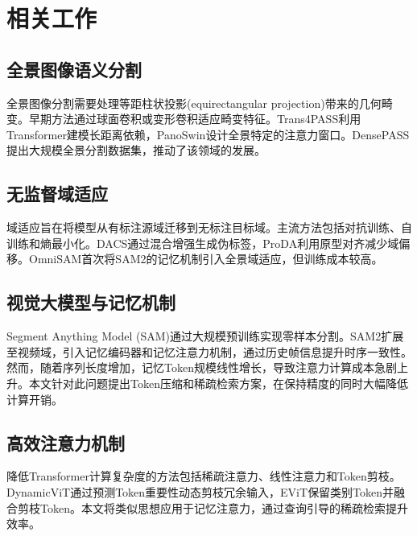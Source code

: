 \section{相关工作}

\subsection{全景图像语义分割}

全景图像分割需要处理等距柱状投影(equirectangular projection)带来的几何畸变。早期方法通过球面卷积\cite{su2017learning}或变形卷积\cite{dai2017deformable}适应畸变特征。Trans4PASS\cite{zhang2022trans4pass}利用Transformer建模长距离依赖，PanoSwin\cite{yang2023panoswin}设计全景特定的注意力窗口。DensePASS\cite{shen2023densepass}提出大规模全景分割数据集，推动了该领域的发展。

\subsection{无监督域适应}

域适应旨在将模型从有标注源域迁移到无标注目标域。主流方法包括对抗训练\cite{tsai2018learning}、自训练\cite{zou2018unsupervised}和熵最小化\cite{vu2019advent}。DACS\cite{tranheden2021dacs}通过混合增强生成伪标签，ProDA\cite{zhang2021prototypical}利用原型对齐减少域偏移。OmniSAM\cite{omnisam2024}首次将SAM2的记忆机制引入全景域适应，但训练成本较高。

\subsection{视觉大模型与记忆机制}

Segment Anything Model (SAM)\cite{kirillov2023segment}通过大规模预训练实现零样本分割。SAM2\cite{ravi2024sam2}扩展至视频域，引入记忆编码器和记忆注意力机制，通过历史帧信息提升时序一致性。然而，随着序列长度增加，记忆Token规模线性增长，导致注意力计算成本急剧上升。本文针对此问题提出Token压缩和稀疏检索方案，在保持精度的同时大幅降低计算开销。

\subsection{高效注意力机制}

降低Transformer计算复杂度的方法包括稀疏注意力\cite{child2019generating}、线性注意力\cite{katharopoulos2020transformers}和Token剪枝\cite{rao2021dynamicvit}。DynamicViT通过预测Token重要性动态剪枝冗余输入，EViT\cite{liang2022not}保留类别Token并融合剪枝Token。本文将类似思想应用于记忆注意力，通过查询引导的稀疏检索提升效率。

